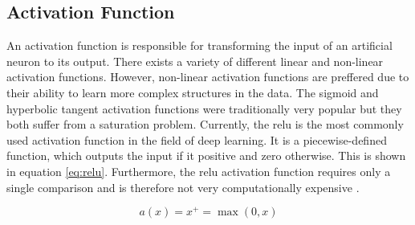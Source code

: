 \subsection{Activation Function}
\label{subsec:theoretical_background:ann:activation_function}

An activation function is responsible for transforming the input of an artificial neuron to its output.
There exists a variety of different linear and non-linear activation functions.
However, non-linear activation functions are preffered due to their ability to learn more complex structures in the data.
The sigmoid and hyperbolic tangent activation functions were traditionally very popular but they both suffer from a saturation problem.
Currently, the \acrfull{relu} is the most commonly used activation function in the field of deep learning.
It is a piecewise-defined function, which outputs the input if it positive and zero otherwise.
This is shown in equation \ref{eq:relu}.
Furthermore, the \acrshort{relu} activation function requires only a single comparison and is therefore not very computationally expensive \cite{relu}.

\begin{equation}
  a(x) = x^+ = \max(0, x)
  \label{eq:relu}
\end{equation}

